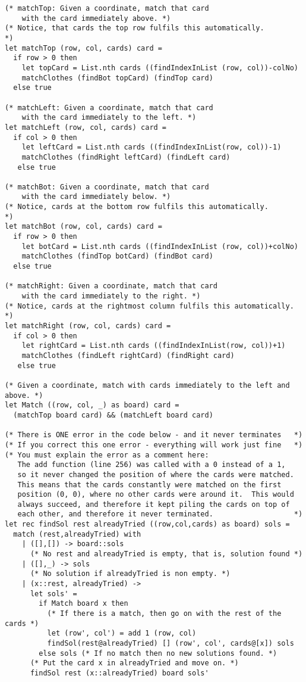 \begin{lstlisting}
(* matchTop: Given a coordinate, match that card 
    with the card immediately above. *)
(* Notice, that cards the top row fulfils this automatically.                     *)
let matchTop (row, col, cards) card =
  if row > 0 then
    let topCard = List.nth cards ((findIndexInList (row, col))-colNo)
    matchClothes (findBot topCard) (findTop card)
  else true

(* matchLeft: Given a coordinate, match that card 
    with the card immediately to the left. *)
let matchLeft (row, col, cards) card =
  if col > 0 then
    let leftCard = List.nth cards ((findIndexInList(row, col))-1)
    matchClothes (findRight leftCard) (findLeft card)
   else true

(* matchBot: Given a coordinate, match that card 
    with the card immediately below. *)
(* Notice, cards at the bottom row fulfils this automatically.                    *)
let matchBot (row, col, cards) card = 
  if row > 0 then
    let botCard = List.nth cards ((findIndexInList (row, col))+colNo)
    matchClothes (findTop botCard) (findBot card)
  else true

(* matchRight: Given a coordinate, match that card 
    with the card immediately to the right. *)
(* Notice, cards at the rightmost column fulfils this automatically.                       *)
let matchRight (row, col, cards) card =
  if col > 0 then
    let rightCard = List.nth cards ((findIndexInList(row, col))+1)
    matchClothes (findLeft rightCard) (findRight card)
   else true

(* Given a coordinate, match with cards immediately to the left and above. *)
let Match ((row, col, _) as board) card =
  (matchTop board card) && (matchLeft board card)

(* There is ONE error in the code below - and it never terminates   *)
(* If you correct this one error - everything will work just fine   *)
(* You must explain the error as a comment here:                   
   The add function (line 256) was called with a 0 instead of a 1, 
   so it never changed the position of where the cards were matched. 
   This means that the cards constantly were matched on the first
   position (0, 0), where no other cards were around it.  This would
   always succeed, and therefore it kept piling the cards on top of
   each other, and therefore it never terminated.                   *)
let rec findSol rest alreadyTried ((row,col,cards) as board) sols =
  match (rest,alreadyTried) with
    | ([],[]) -> board::sols 
      (* No rest and alreadyTried is empty, that is, solution found *)
    | ([],_) -> sols         
      (* No solution if alreadyTried is non empty. *)
    | (x::rest, alreadyTried) ->
      let sols' = 
        if Match board x then
          (* If there is a match, then go on with the rest of the cards *)
          let (row', col') = add 1 (row, col)
          findSol(rest@alreadyTried) [] (row', col', cards@[x]) sols
        else sols (* If no match then no new solutions found. *)
      (* Put the card x in alreadyTried and move on. *)
      findSol rest (x::alreadyTried) board sols'


\end{lstlisting}
